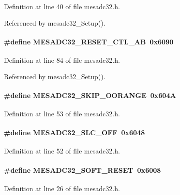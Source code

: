Definition at line 40 of file mesadc32.h.

Referenced by mesadc32\_\-Setup().
\paragraph[{MESADC32\_\-RESET\_\-CTL\_\-AB}]{\setlength{\rightskip}{0pt plus 5cm}\#define MESADC32\_\-RESET\_\-CTL\_\-AB~0x6090}\hfill\label{mesadc32_8h_a7d39bbcd4c9c2c302f2fec028d50175b}


Definition at line 84 of file mesadc32.h.

Referenced by mesadc32\_\-Setup().
\paragraph[{MESADC32\_\-SKIP\_\-OORANGE}]{\setlength{\rightskip}{0pt plus 5cm}\#define MESADC32\_\-SKIP\_\-OORANGE~0x604A}\hfill\label{mesadc32_8h_a0eb582943343c3efb6501aa93a557d67}


Definition at line 53 of file mesadc32.h.
\paragraph[{MESADC32\_\-SLC\_\-OFF}]{\setlength{\rightskip}{0pt plus 5cm}\#define MESADC32\_\-SLC\_\-OFF~0x6048}\hfill\label{mesadc32_8h_ab8fa947e7e3fcb32b904f86f8e0f401a}


Definition at line 52 of file mesadc32.h.
\paragraph[{MESADC32\_\-SOFT\_\-RESET}]{\setlength{\rightskip}{0pt plus 5cm}\#define MESADC32\_\-SOFT\_\-RESET~0x6008}\hfill\label{mesadc32_8h_a0a1e80d3cc993f68a451023019817d02}


Definition at line 26 of file mesadc32.h.

